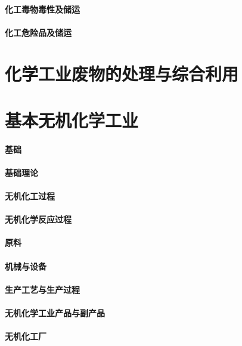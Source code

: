 \documentclass[UTF8]{../../ApplicationUniverse}
\begin{document}
        \subsubsection{化工毒物毒性及储运}
        \subsubsection{化工危险品及储运}



\chapter{化学工业废物的处理与综合利用}


\chapter{基本无机化学工业}
\subsubsection{基础}
    \subsubsection{基础理论}
    \subsubsection{无机化工过程}
    \subsubsection{无机化学反应过程}
    \subsubsection{原料}
    \subsubsection{机械与设备}
    \subsubsection{生产工艺与生产过程}
    \subsubsection{无机化学工业产品与副产品}
    \subsubsection{无机化工厂}
\end{document}
